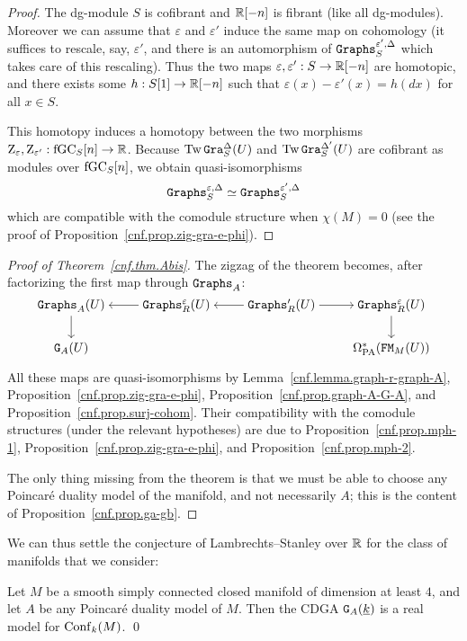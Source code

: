 \begin{proof}
  The dg-module $S$ is cofibrant and $\mathbb{R}[-n]$ is fibrant (like all dg-modules).
  Moreover we can assume that $\varepsilon$ and $\varepsilon'$ induce the same map on cohomology (it suffices to rescale, say, $\varepsilon'$, and there is an automorphism of $\mathtt{Graphs}_{S}^{\varepsilon',\Delta}$ which takes care of this rescaling).
  Thus the two maps $\varepsilon, \varepsilon' : S \to \mathbb{R}[-n]$ are homotopic, and there exists some $h : S[1] \to \mathbb{R}[-n]$ such that $\varepsilon(x) - \varepsilon'(x) = h(dx)$ for all $x \in S$.

  This homotopy induces a homotopy between the two morphisms $\mathrm{Z}_{\varepsilon}, \mathrm{Z}_{\varepsilon'} : \mathrm{fGC}_{S}[n] \to \mathbb{R}$.
  Because $\operatorname{Tw} \mathtt{Gra}_{S}^{\Delta}(U)$ and $\operatorname{Tw} \mathtt{Gra}_{S}^{\Delta'}(U)$ are cofibrant as modules over $\mathrm{fGC}_{S}[n]$, we obtain quasi-isomorphisms
  \[ \mathtt{Graphs}_{S}^{\varepsilon,\Delta} \simeq \mathtt{Graphs}_{S}^{\varepsilon',\Delta} \]
  which are compatible with the comodule structure when $\chi(M) = 0$ (see the proof of Proposition~\ref{cnf.prop.zig-gra-e-phi}).
\end{proof}

\begin{proof}[Proof of Theorem~\ref{cnf.thm.Abis}]
  The zigzag of the theorem becomes, after factorizing the first map through $\mathtt{Graphs}_{A}$:
  \[ \begin{tikzcd}[cramped]
      \Graphs_{A}(U) \ar[d] & \Graphs^{\varepsilon}_{R}(U) \ar[l] & \Graphs'_{R}(U) \ar[l] \ar[r] & \Graphs^{\varepsilon}_{R}(U) \ar[d] \\
      \GG{A}(U) &&& \OmPA^{*}(\FM_{M}(U))
  \end{tikzcd} \]

  All these maps are quasi-isomorphisms by Lemma~\ref{cnf.lemma.graph-r-graph-A}, Proposition~\ref{cnf.prop.zig-gra-e-phi}, Proposition~\ref{cnf.prop.graph-A-G-A}, and Proposition~\ref{cnf.prop.surj-cohom}.
  Their compatibility with the comodule structures (under the relevant hypotheses) are due to Proposition~\ref{cnf.prop.mph-1}, Proposition~\ref{cnf.prop.zig-gra-e-phi}, and Proposition~\ref{cnf.prop.mph-2}.

  The only thing missing from the theorem is that we must be able to choose any Poincaré duality model of the manifold, and not necessarily $A$; this is the content of Proposition~\ref{cnf.prop.ga-gb}.
\end{proof}

We can thus settle the conjecture of Lambrechts--Stanley over $\mathbb{R}$ for the class of manifolds that we consider:

\begin{corollary}
  Let $M$ be a smooth simply connected closed manifold of dimension at least $4$, and let $A$ be any Poincaré duality model of $M$.
  Then the CDGA $\mathtt{G}_{A}(\underline{k})$ is a real model for $\operatorname{Conf}_{k}(M)$.
  \qed
\end{corollary}

